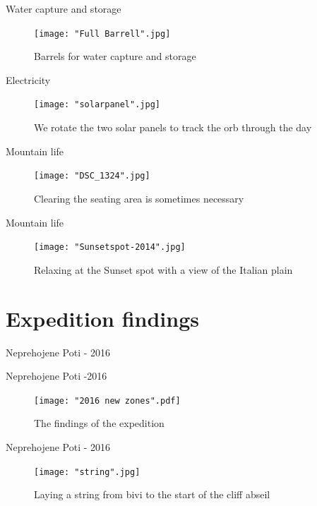 \documentclass[10pt]{beamer}
\begin{document}
\begin{frame}{Water capture and storage}
    \begin{figure}[!ht]
    \centering
    \texttt{[image: "Full Barrell".jpg]}
    \caption{Barrels for water capture and storage}
    \end{figure}
\end{frame} 

\begin{frame}{Electricity}
    \begin{figure}[!ht]
    \centering
    \texttt{[image: "solarpanel".jpg]}
    \caption{We rotate the two solar panels to track the orb through the day}
    \end{figure}
\end{frame}

\begin{frame}{Mountain life}
    \begin{figure}[!ht]
    \centering
    \texttt{[image: "DSC\_1324".jpg]}
    \caption{Clearing the seating area is sometimes necessary}
    \end{figure}
\end{frame}

\begin{frame}{Mountain life}
    \begin{figure}[!ht]
    \centering
    \texttt{[image: "Sunsetspot-2014".jpg]}
    \caption{Relaxing at the Sunset spot with a view of the Italian plain}
    \end{figure}
\end{frame}

\section{Expedition findings}


\begin{frame}[standout]
Neprehojene Poti - 2016
\end{frame}

\begin{frame}{Neprehojene Poti -2016}
    \begin{figure}[!ht]
    \centering
    \texttt{[image: "2016 new zones".pdf]}
    \caption{The findings of the expedition}
    \end{figure}
\end{frame} 
\begin{frame}{Neprehojene Poti - 2016}
    \begin{figure}[!ht]
    \centering
    \texttt{[image: "string".jpg]}
    \caption{Laying a string from bivi to the start of the cliff abseil}
    \end{figure}
\end{frame} 
\end{document}
